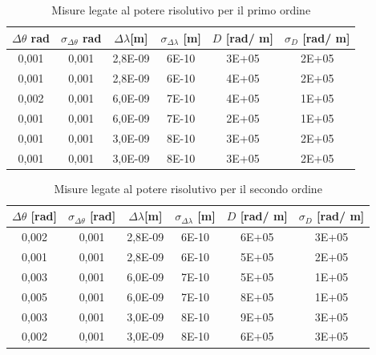 \documentclass{article}
\begin{document}
        \begin{table}[H]
            \centering
            \begin{tabular}{c c c c c c }
                \toprule 
                $\Delta \theta$ rad &$\sigma_{\Delta \theta}$ rad & $\Delta \lambda$[m]  & $\sigma_{\Delta \lambda}$ [m] & $D$ [rad/ m] & $\sigma_D$ [rad/ m] \\
                \midrule
                0,001	&	0,001	&	2,8E-09	&	6E-10	&	3E+05	&	2E+05\\
                0,001	&	0,001	&	2,8E-09	&	6E-10	&	4E+05	&	2E+05\\
                0,002	&	0,001	&	6,0E-09	&	7E-10	&	4E+05	&	1E+05\\
                0,001	&	0,001	&	6,0E-09	&	7E-10	&	2E+05	&	1E+05\\
                0,001	&	0,001	&	3,0E-09	&	8E-10	&	3E+05	&	2E+05\\
                0,001	&	0,001	&	3,0E-09	&	8E-10	&	3E+05	&	2E+05\\
                \bottomrule
            \end{tabular}
            \caption{Misure legate al potere risolutivo per il primo ordine}
            \label{D ordine 1}
        \end{table}
        
        \begin{table}[H]
            \centering
            \begin{tabular}{c c c c c c }
                \toprule 
                $\Delta \theta$ [rad] &$\sigma_{\Delta \theta}$ [rad] & $\Delta \lambda$[m]  & $\sigma_{\Delta \lambda}$ [m] & $D$ [rad/ m] & $\sigma_D$ [rad/ m] \\
                \midrule
                0,002	&	0,001	&	2,8E-09	&	6E-10	&	6E+05	&	3E+05\\
                0,001	&	0,001	&	2,8E-09	&	6E-10	&	5E+05	&	2E+05\\
                0,003	&	0,001	&	6,0E-09	&	7E-10	&	5E+05	&	1E+05\\
                0,005	&	0,001	&	6,0E-09	&	7E-10	&	8E+05	&	1E+05\\
                0,003	&	0,001	&	3,0E-09	&	8E-10	&	9E+05	&	3E+05\\
                0,002	&	0,001	&	3,0E-09	&	8E-10	&	6E+05	&	3E+05\\
                \bottomrule
            \end{tabular}
            \caption{Misure legate al potere risolutivo per il secondo ordine}
            \label{D ordine 2}
        \end{table}
        
\end{document}
